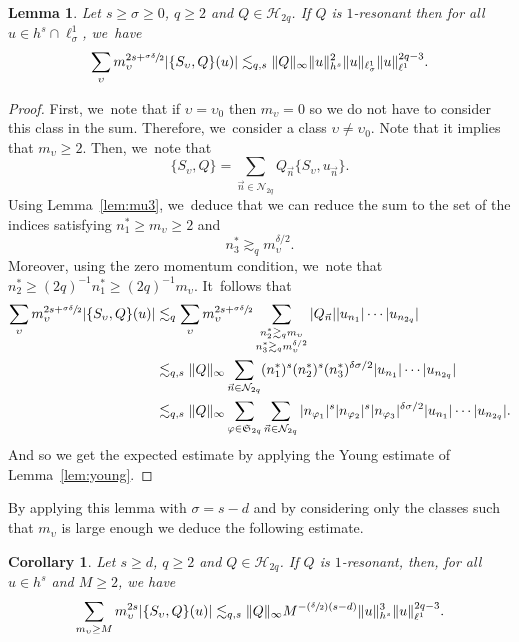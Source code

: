 \documentclass[10pt]{amsart}
\newcommand{\Psfrac}[2]{(\sfrac{#1}{#2})}
\theoremstyle{plain}
\newtheorem{corollary}[theorem]{Corollary}
\newtheorem{lemma}[theorem]{Lemma}
\theoremstyle{definition}
\newcommand{\1}{\mathbf{1}}
\begin{document}
\begin{lemma} Let $s\geq \sigma \geq 0$, $q\geq 2$ and $Q\in\mathcal{H}_{2q}$. If $Q$ is $1$-resonant then for all $u\in h^{s} \cap \ell^1_\sigma$, we~have
\[
\sum_{\upsilon} m_\upsilon^{2s+\sfrac{\sigma \delta}2} |\{S_{\upsilon},Q\}(u)| \lesssim_{q,s} \|Q\|_{\infty} \|u\|_{h^{s}}^{2} \| u \|_{\ell^1_\sigma} \|u\|_{\ell^{1}}^{2q-3}.
\]
\end{lemma}
\begin{proof} First, we~note that if $\upsilon = \upsilon_0$ then $m_\upsilon = 0$ so we do not have to consider this class in the sum. Therefore, we~consider a class $\upsilon \neq \upsilon_0$. Note that it implies that $m_{\upsilon} \geq 2.$ Then, we~note that
\[
\{S_{\upsilon},Q\} = \sum_{\vec{n}\in\mathcal{N}_{2q}} Q_{\vec{n}} \{S_\upsilon, u_{\vec{n}} \}.
\]
Using Lemma~\ref{lem:mu3}, we~deduce that we can reduce the sum to the set of the indices satisfying $n_{1}^{\ast}\geq m_\upsilon \geq 2$ and
\[
n_{3}^{\ast}\gtrsim_{q}m_\upsilon^{\delta/2}.
\]
Moreover, using the zero momentum condition, we~note that $n_{2}^{\ast}\geq (2q)^{-1} n_1^\ast \geq (2q)^{-1} m_\upsilon$. It~follows that
\begin{align*}
\sum_{\upsilon } m_\upsilon^{2s+\sfrac{\sigma \delta}2}|\{S_{\upsilon},Q\}(u)|
&\lesssim_q \sum_{\upsilon} m_\upsilon^{2s+\sfrac{\sigma \delta}2} \sum_{\substack{n_{2}^{\ast} \gtrsim_q m_\upsilon \\ n_{3}^{\ast} \gtrsim_{q} m_\upsilon^{\delta/2} }}|Q_{\vec{n}}||u_{n_1}| \cdots |u_{n_{2q}}| \\
&\lesssim_{q,s} \| Q\|_{\infty} \sum_{\vec{n}\in\mathcal{N}_{2q}} (n_{1}^{\ast})^{s} (n_{2}^{\ast})^{s} (n_{3}^{\ast})^{\delta \sigma /2} |u_{n_{1}}|\cdots |u_{n_{2q}}| \\
&\lesssim_{q,s} \| Q\|_{\infty} \sum_{\varphi \in \mathfrak{S}_{2q}} \sum_{\vec{n}\in\mathcal{N}_{2q}} |n_{\varphi_1}|^{s} |n_{\varphi_2}|^{s} |n_{\varphi_3}|^{\delta \sigma /2} |u_{n_{1}}|\cdots |u_{n_{2q}}|.
\end{align*}
And so we get the expected estimate by applying the Young estimate of Lemma~\ref{lem:young}.
\end{proof}

By applying this lemma with $\sigma = s-d$ and by considering only the classes such that $m_\upsilon$ is large enough we deduce the following estimate.
\begin{corollary}
\label{cor:super}Let $s\geq d$, $q\geq 2$ and $Q\in\mathcal{H}_{2q}$. If $Q$ is $1$-resonant, then, for all $u\in h^{s}$ and $M\geq 2$, we have
\begin{equation}
\label{eq:super}
\sum_{m_\upsilon \geq M} m_\upsilon^{2s} |\{S_{\upsilon},Q\}(u)| \lesssim_{q,s} \|Q\|_{\infty} M^{-\Psfrac{\delta}{2}(s-d)}\|u\|_{h^{s}}^{3} \|u\|_{\ell^{1}}^{2q-3}.
\end{equation}
\end{corollary}
\end{document}
